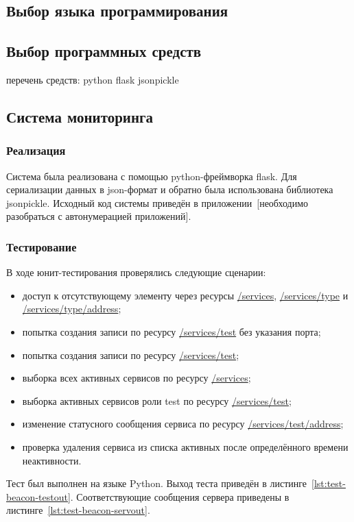 \documentclass[a4paper,12pt]{report}
\numberwithin{equation}{section}
\begin{document}
\subsection{Выбор языка программирования}

\subsection{Выбор программных средств}
перечень средств:
python
  flask
  jsonpickle
  

\subsection{Система мониторинга}
\subsubsection{Реализация}
Система была реализована с помощью python-фреймворка flask.
Для сериализации данных в json-формат и обратно была использована библиотека jsonpickle.
Исходный код системы приведён в приложении~[необходимо разобраться с автонумерацией приложений].

\subsubsection{Тестирование}
В ходе юнит-тестирования проверялись следующие сценарии:

\begin{itemize}
  \item доступ к отсутствующему элементу через ресурсы \url{/services}, \url{/services/type} и \url{/services/type/address};
  \item попытка создания записи по ресурсу \url{/services/test} без указания порта;
  \item попытка создания записи по ресурсу \url{/services/test};
  \item выборка всех активных сервисов по ресурсу \url{/services};
  \item выборка активных сервисов роли test по ресурсу \url{/services/test};
  \item изменение статусного сообщения сервиса по ресурсу \url{/services/test/address};
  \item проверка удаления сервиса из списка активных после определённого времени неактивности.
\end{itemize}

Тест был выполнен на языке Python.
Выход теста приведён в листинге~\ref{lst:test-beacon-testout}.
Соответствующие сообщения сервера приведены в листинге~\ref{lst:test-beacon-servout}.
\end{document}
